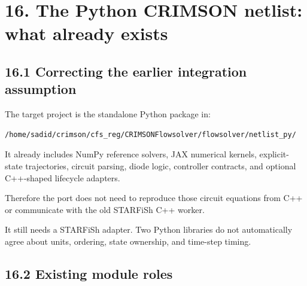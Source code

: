 \documentclass[11pt,a4paper]{article}
\begin{document}
\clearpage
\section{16. The Python CRIMSON netlist: what already exists}
\subsection{16.1 Correcting the earlier integration assumption}
The target project is the standalone Python package in:


\begin{lstlisting}
/home/sadid/crimson/cfs_reg/CRIMSONFlowsolver/flowsolver/netlist_py/
\end{lstlisting}
It already includes NumPy reference solvers, JAX numerical kernels, explicit-state trajectories, circuit parsing, diode logic, controller contracts, and optional C++-shaped lifecycle adapters.

Therefore the port does not need to reproduce those circuit equations from C++ or communicate with the old STARFiSh C++ worker.

It still needs a STARFiSh adapter. Two Python libraries do not automatically agree about units, ordering, state ownership, and time-step timing.

\subsection{16.2 Existing module roles}
\end{document}
